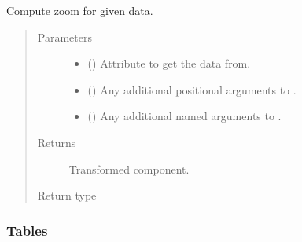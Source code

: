 \documentclass[letterpaper,10pt,english]{sphinxmanual}
\begin{document}
\begin{fulllineitems}
\begin{fulllineitems}
\label{\detokenize{api/states:geology.src.States.zoom}}
Compute zoom for given data.
\begin{quote}\begin{description}
\item[{Parameters}] \leavevmode\begin{itemize}
\item {} 
 (\sphinxstyleliteralemphasis{\sphinxupquote{, }}) \textendash{} Attribute to get the data from.

\item {} 
 () \textendash{} Any additional positional arguments to .

\item {} 
 () \textendash{} Any additional named arguments to .

\end{itemize}

\item[{Returns}] \leavevmode
{} \textendash{} Transformed component.

\item[{Return type}] \leavevmode
{\hyperref[\detokenize{api/base_classes:geology.src.base_spatial.SpatialComponent}]{}}

\end{description}\end{quote}

\end{fulllineitems}


\end{fulllineitems}



\subsubsection{Tables}
\label{\detokenize{api/tables:tables}}\label{\detokenize{api/tables::doc}}
\end{document}

